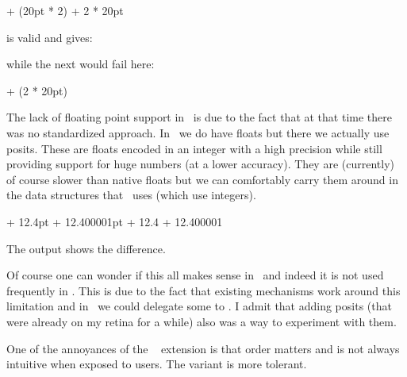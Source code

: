 \startbuffer
\the \dimexpr 10pt + (20pt * 2) \relax
\the \dimexpr 10pt + {2 * 20pt} \relax
\stopbuffer

\typebuffer[option=TEX]

is valid and gives:

\startlines
\getbuffer
\stoplines

while the next would fail here:

\starttyping[option=TEX]
\the \dimexpr 10pt + (2 * 20pt) \relax
\stoptyping

The lack of floating point support in \TEX\ is due to the fact that at that time
there was no standardized approach. In \LUAMETATEX\ we do have floats but there
we actually use posits. These are floats encoded in an integer with a high
precision while still providing support for huge numbers (at a lower accuracy).
They are (currently) of course slower than native floats but we can comfortably
carry them around in the data structures that \TEX\ uses (which use integers).

\startbuffer
\thewithoutunit\dimexpr   10.2pt + 12.4pt      \relax
\thewithoutunit\dimexpr   10.2pt + 12.400001pt \relax
\the           {}   + 12.4        \relax
\the           {}   + 12.400001   \relax
\stopbuffer

\typebuffer[option=TEX]

The output shows the difference.

\startlines
\getbuffer
\stoplines

Of course one can wonder if this all makes sense in \TEX\ and indeed it is not
used frequently in \CONTEXT. This is due to the fact that existing mechanisms
work around this limitation and in \MKIV\ we could delegate some to \LUA. I admit
that adding posits (that were already on my retina for a while) also was a way to
experiment with them.


\stopsectionlevel

\startsectionlevel[title={\type {\...expression}}]

One of the annoyances of the \ETEX\ \type {\dimexpr} extension is that order
matters and is not always intuitive when exposed to users. The \type
{\dimexpression} variant is more tolerant.

\startbuffer
\the{}
\the{}
\stopbuffer

\typebuffer[option=TEX]

